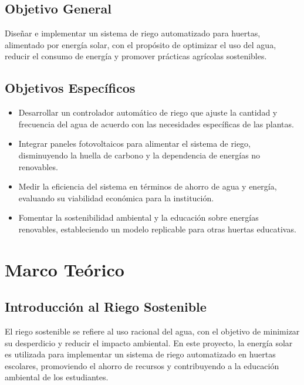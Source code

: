 \documentclass[12pt]{article}
\begin{document}
\subsection{Objetivo General}
Diseñar e implementar un sistema de riego automatizado para huertas, alimentado por energía solar, con el propósito de optimizar el uso del agua, reducir el consumo de energía y promover prácticas agrícolas sostenibles.

\subsection{Objetivos Específicos}
\begin{itemize}
      \item Desarrollar un controlador automático de riego que ajuste la cantidad y frecuencia del agua de acuerdo con las necesidades específicas de las plantas.
      \item Integrar paneles fotovoltaicos para alimentar el sistema de riego, disminuyendo la huella de carbono y la dependencia de energías no renovables.
      \item Medir la eficiencia del sistema en términos de ahorro de agua y energía, evaluando su viabilidad económica para la institución.
      \item Fomentar la sostenibilidad ambiental y la educación sobre energías renovables, estableciendo un modelo replicable para otras huertas educativas.
\end{itemize}
\newpage
\section{Marco Teórico}
\subsection{Introducción al Riego Sostenible}
El riego sostenible se refiere al uso racional del agua, con el objetivo de minimizar su desperdicio y reducir el impacto ambiental. En este proyecto, la energía solar es utilizada para implementar un sistema de riego automatizado en huertas escolares, promoviendo el ahorro de recursos y contribuyendo a la educación ambiental de los estudiantes.
\end{document}
